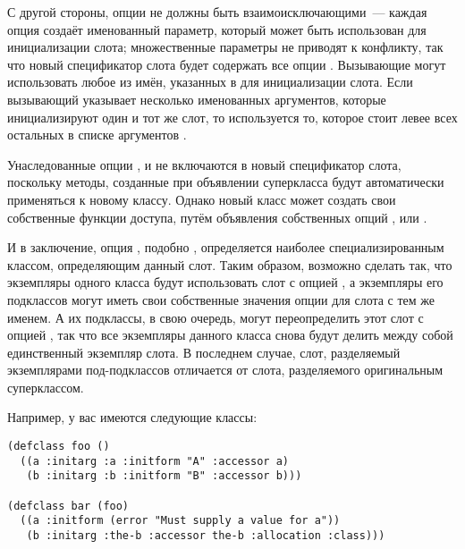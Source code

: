 С другой стороны, опции  не должны быть взаимоисключающими~--- каждая опция
 создаёт именованный параметр, который может быть использован для
инициализации слота; множественные параметры не приводят к конфликту, так что новый
спецификатор слота будет содержать все опции . Вызывающие
 могут использовать любое из имён, указанных в  для
инициализации слота. Если вызывающий указывает несколько именованных аргументов, которые
инициализируют один и тот же слот, то используется то, которое стоит левее всех остальных
в списке аргументов .

Унаследованные опции ,  и  не включаются в
новый спецификатор слота, поскольку методы, созданные при объявлении суперкласса будут
автоматически применяться к новому классу.  Однако новый класс может создать свои
собственные функции доступа, путём объявления собственных опций ,
 или .

И в заключение, опция , подобно , определяется наиболее
специализированным классом, определяющим данный слот.  Таким образом, возможно сделать
так, что экземпляры одного класса будут использовать слот с опцией , а
экземпляры его подклассов могут иметь свои собственные значения опции  для
слота с тем же именем.  А их подклассы, в свою очередь, могут переопределить этот слот с
опцией , так что все экземпляры данного класса снова будут делить между собой
единственный экземпляр слота.  В последнем случае, слот, разделяемый экземплярами
под-подклассов отличается от слота, разделяемого оригинальным суперклассом.

Например, у вас имеются следующие классы:

\begin{lstlisting}
(defclass foo ()
  ((a :initarg :a :initform "A" :accessor a)
   (b :initarg :b :initform "B" :accessor b)))

(defclass bar (foo)
  ((a :initform (error "Must supply a value for a"))
   (b :initarg :the-b :accessor the-b :allocation :class)))
\end{lstlisting}

